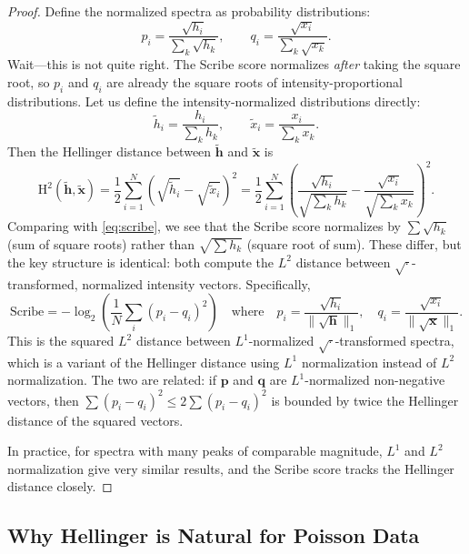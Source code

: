 \documentclass[11pt,a4paper]{article}
\newcommand{\Hell}{\mathrm{H}}
\begin{document}
\begin{proof}
Define the normalized spectra as probability distributions:
\[
    p_i = \frac{\sqrt{h_i}}{\sum_k \sqrt{h_k}}, \qquad
    q_i = \frac{\sqrt{x_i}}{\sum_k \sqrt{x_k}}.
\]
Wait---this is not quite right. The Scribe score normalizes \emph{after} taking the square
root, so $p_i$ and $q_i$ are already the square roots of intensity-proportional distributions.
Let us define the intensity-normalized distributions directly:
\[
    \tilde{h}_i = \frac{h_i}{\sum_k h_k}, \qquad
    \tilde{x}_i = \frac{x_i}{\sum_k x_k}.
\]
Then the Hellinger distance between $\tilde{\mathbf{h}}$ and $\tilde{\mathbf{x}}$ is
\[
    \Hell^2(\tilde{\mathbf{h}}, \tilde{\mathbf{x}})
    = \frac{1}{2} \sum_{i=1}^{N}
        \left(\sqrt{\tilde{h}_i} - \sqrt{\tilde{x}_i}\right)^2
    = \frac{1}{2} \sum_{i=1}^{N}
        \left(
            \frac{\sqrt{h_i}}{\sqrt{\sum_k h_k}}
            - \frac{\sqrt{x_i}}{\sqrt{\sum_k x_k}}
        \right)^{\!2}.
\]
Comparing with \eqref{eq:scribe}, we see that the Scribe score normalizes by
$\sum \sqrt{h_k}$ (sum of square roots) rather than $\sqrt{\sum h_k}$ (square root of sum).
These differ, but the key structure is identical: both compute the $L^2$ distance between
$\sqrt{\cdot}$-transformed, normalized intensity vectors. Specifically,
\begin{equation}
    \text{Scribe} = -\log_2\!\left(\frac{1}{N}\sum_i (p_i - q_i)^2\right)
    \quad \text{where} \quad
    p_i = \frac{\sqrt{h_i}}{\|\sqrt{\mathbf{h}}\|_1}, \quad
    q_i = \frac{\sqrt{x_i}}{\|\sqrt{\mathbf{x}}\|_1}.
\end{equation}
This is the squared $L^2$ distance between $L^1$-normalized $\sqrt{\cdot}$-transformed
spectra, which is a variant of the Hellinger distance using $L^1$ normalization instead of
$L^2$ normalization. The two are related: if $\mathbf{p}$ and $\mathbf{q}$ are
$L^1$-normalized non-negative vectors, then $\sum(p_i - q_i)^2 \leq 2\sum(p_i - q_i)^2$
is bounded by twice the Hellinger distance of the squared vectors.

In practice, for spectra with many peaks of comparable magnitude, $L^1$ and $L^2$
normalization give very similar results, and the Scribe score tracks the Hellinger distance
closely.
\end{proof}

\subsection{Why Hellinger is Natural for Poisson Data}
\end{document}

